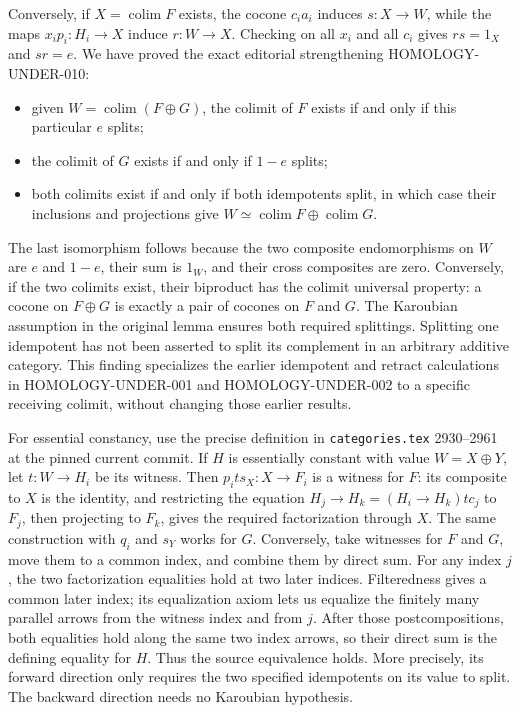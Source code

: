 \documentclass[11pt]{article}
\providecommand{\tightlist}{\setlength{\itemsep}{0pt}\setlength{\parskip}{0pt}}
\begin{document}
Conversely, if \(X=\operatorname{colim}F\) exists, the cocone \(c_i a_i\) induces \(s:X\to W\), while the maps \(x_i p_i:H_i\to X\) induce \(r:W\to X\). Checking on all \(x_i\) and all \(c_i\) gives \(rs=1_X\) and \(sr=e\). We have proved the exact editorial strengthening HOMOLOGY-UNDER-010:

\begin{itemize}
\tightlist
\item
  given \(W=\operatorname{colim}(F\oplus G)\), the colimit of \(F\) exists if and only if this particular \(e\) splits;
\item
  the colimit of \(G\) exists if and only if \(1-e\) splits;
\item
  both colimits exist if and only if both idempotents split, in which case their inclusions and projections give \(W\simeq\operatorname{colim}F\oplus\operatorname{colim}G\).
\end{itemize}

The last isomorphism follows because the two composite endomorphisms on \(W\) are \(e\) and \(1-e\), their sum is \(1_W\), and their cross composites are zero. Conversely, if the two colimits exist, their biproduct has the colimit universal property: a cocone on \(F\oplus G\) is exactly a pair of cocones on \(F\) and \(G\). The Karoubian assumption in the original lemma ensures both required splittings. Splitting one idempotent has not been asserted to split its complement in an arbitrary additive category. This finding specializes the earlier idempotent and retract calculations in HOMOLOGY-UNDER-001 and HOMOLOGY-UNDER-002 to a specific receiving colimit, without changing those earlier results.

For essential constancy, use the precise definition in \texttt{categories.tex} 2930--2961 at the pinned current commit. If \(H\) is essentially constant with value \(W=X\oplus Y\), let \(t:W\to H_i\) be its witness. Then \(p_i t s_X:X\to F_i\) is a witness for \(F\): its composite to \(X\) is the identity, and restricting the equation \(H_j\to H_k=(H_i\to H_k)t c_j\) to \(F_j\), then projecting to \(F_k\), gives the required factorization through \(X\). The same construction with \(q_i\) and \(s_Y\) works for \(G\). Conversely, take witnesses for \(F\) and \(G\), move them to a common index, and combine them by direct sum. For any index \(j\), the two factorization equalities hold at two later indices. Filteredness gives a common later index; its equalization axiom lets us equalize the finitely many parallel arrows from the witness index and from \(j\). After those postcompositions, both equalities hold along the same two index arrows, so their direct sum is the defining equality for \(H\). Thus the source equivalence holds. More precisely, its forward direction only requires the two specified idempotents on its value to split. The backward direction needs no Karoubian hypothesis.
\end{document}
